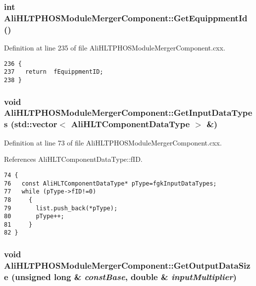 \subsubsection{\setlength{\rightskip}{0pt plus 5cm}int Ali\-HLTPHOSModule\-Merger\-Component::Get\-Equippment\-Id ()}\label{classAliHLTPHOSModuleMergerComponent_a9}




Definition at line 235 of file Ali\-HLTPHOSModule\-Merger\-Component.cxx.

\footnotesize\begin{verbatim}236 {
237   return  fEquippmentID;
238 }
\end{verbatim}\normalsize 


\subsubsection{\setlength{\rightskip}{0pt plus 5cm}void Ali\-HLTPHOSModule\-Merger\-Component::Get\-Input\-Data\-Types (std::vector$<$ {\bf Ali\-HLTComponent\-Data\-Type} $>$ \&)\hspace{0.3cm}{\tt  [virtual]}}\label{classAliHLTPHOSModuleMergerComponent_a11}




Definition at line 73 of file Ali\-HLTPHOSModule\-Merger\-Component.cxx.

References Ali\-HLTComponent\-Data\-Type::f\-ID.

\footnotesize\begin{verbatim}74 {
76   const AliHLTComponentDataType* pType=fgkInputDataTypes;
77   while (pType->fID!=0) 
78     {
79       list.push_back(*pType);
80       pType++;
81     }
82 }
\end{verbatim}\normalsize 


\subsubsection{\setlength{\rightskip}{0pt plus 5cm}void Ali\-HLTPHOSModule\-Merger\-Component::Get\-Output\-Data\-Size (unsigned long \& {\em const\-Base}, double \& {\em input\-Multiplier})\hspace{0.3cm}{\tt  [virtual]}}\label{classAliHLTPHOSModuleMergerComponent_a13}


